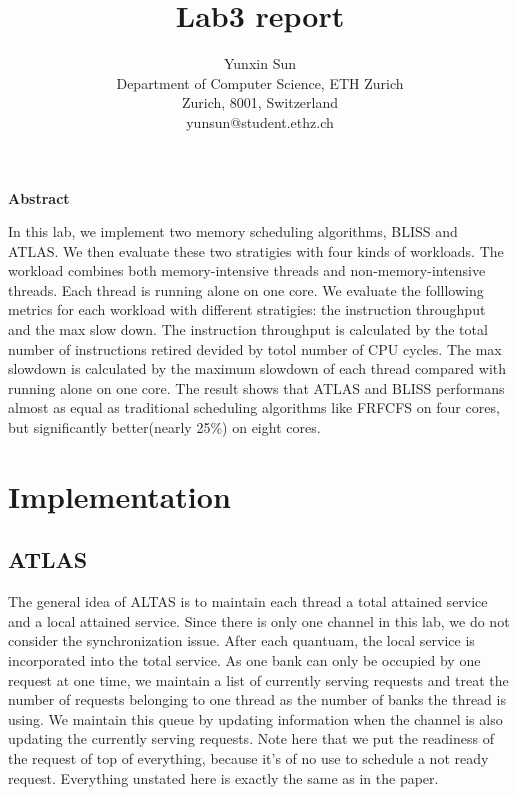 \documentclass[letterpaper,twocolumn]{article}
\date{}
\begin{document}
\title{\Large\textbf{Lab3 report}\normalsize}

\author {Yunxin Sun\\
Department of Computer Science, ETH Zurich\\
Zurich, 8001, Switzerland\\
yunsun@student.ethz.ch
}
\maketitle 

\thispagestyle{empty}

\begin{center}
\large\textbf{Abstract}
\end{center}

\vspace{2mm}
In this lab, we implement two memory scheduling algorithms, BLISS and ATLAS. We then evaluate these two stratigies with four kinds of workloads.
The workload combines both memory-intensive threads and non-memory-intensive threads. Each thread is running alone on one core. 
We evaluate the folllowing metrics for each workload with different stratigies: the instruction throughput and the max slow down. 
The instruction throughput is calculated by the total number of instructions retired devided by totol number of CPU cycles. The max slowdown is calculated by the maximum slowdown of each thread compared with 
running alone on one core. The result shows that ATLAS and BLISS performans almost as equal as traditional 
scheduling algorithms like FRFCFS on four cores, but significantly better(nearly 25\%) on eight cores. 
\medskip
\noindent

\section{Implementation} 
\subsection{ATLAS}
The general idea of ALTAS is to maintain each thread a total attained service and a local attained service.
Since there is only one channel in this lab, we do not consider the synchronization issue. 
After each quantuam, the local service is incorporated into the total service. As one bank can only be occupied 
by one request at one time, we maintain a list of currently serving requests and treat the number of requests belonging to one thread as the number of banks the thread is using.
We maintain this queue by updating information when the channel is also updating the currently serving requests. 
Note here that we put the readiness of the request of top of everything, because it's of no use to schedule a not ready request.
Everything unstated here is exactly the same as in the paper.
\end{document}
